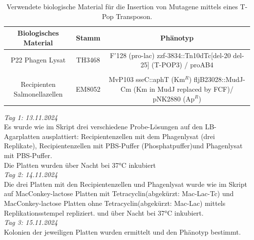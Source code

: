 \documentclass[oneside,10pt,a4paper]{report}
\begin{document}
			\begin{table}[H]
			\centering
			\caption{Verwendete biologische Material für die Insertion von Mutagene mittels eines T-Pop Transposon.}
			\label{tab: exp2-biologisches Material}
			\begin{tabular}{ccc}
				\toprule
				Biologisches Material& Stamm & Phänotyp\\
				\midrule
				\multirow{2}{*}{P22 Phagen Lysat} & \multirow{2}{*}{TH3468} & \multirow{2}{*}{\parbox[t]{9cm}{F’128 (pro-lac) zzf-3834::Tn10dTc[del-20 del-25] (T-POP3) / proAB4}}\\
				&&\\
				&&\\
				\multirow{3}{*}{\parbox[t]{3cm}{Recipienten Salmonellazellen}} & \multirow{3}{*}{EM8052} &\multirow{3}{*}{\parbox[t]{9cm}{MvP103 sseC::aphT (Km$^R$) fljB23028::MudJ-Cm (Km in MudJ replaced by FCF)/ pNK2880 (Ap$^R$)}} \\
				&&\\
				&&\\

				\bottomrule			
			\end{tabular}
		\end{table}

		\textit{Tag 1: 13.11.2024}\\
		Es wurde wie im Skript \cite{Mibi-Script} drei verschiedene Probe-Lösungen auf den LB-Agarplatten ausplattiert: Recipientenzellen mit dem Phagenlysat (drei Replikate), Recipientenzellen mit PBS-Puffer (Phosphatpuffer)und Phagenlysat mit PBS-Puffer.\\
		Die Platten wurden über Nacht bei 37°C inkubiert
		\\
		\textit{Tag 2: 14.11.2024}\\
		Die drei Platten mit den Recipientenzellen und Phagenlysat wurde wie im Skript \cite{Mibi-Script} auf MacConkey-lactose Platten mit Tetracyclin(abgekürzt: Mac-Lac-Tc) und MacConkey-lactose Platten ohne Tetracyclin(abgekürzt: Mac-Lac) mittels Replikationsstempel repliziert. und über Nacht bei 37°C inkubiert.\\
		\textit{Tag 3: 15.11.2024}\\
		Kolonien der jeweiligen Platten wurden ermittelt und den Phänotyp bestimmt.
\end{document}
